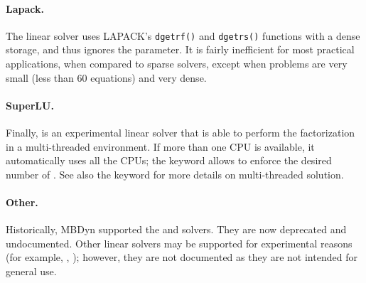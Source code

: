 \paragraph{Lapack.}
The  linear solver uses LAPACK's \texttt{dgetrf()}
and \texttt{dgetrs()} functions with a dense storage,
and thus ignores the  parameter.
It is fairly inefficient for most practical applications,
when compared to sparse solvers, except when problems are very small
(less than 60 equations) and very dense.

\paragraph{SuperLU.}
Finally,  is an experimental linear solver that is able to perform
the factorization in a multi-threaded environment.
If more than one CPU is available, it automatically uses all the CPUs;
the keyword  allows to enforce the desired number of .
See also the  keyword for more details on multi-threaded
solution.

\begin{comment}
Another linear solver, that is available mostly for historical reasons, 
is \kw{harwell}, with a \nt{workspace\_size}
of $ \nt{numdofs}\times\nt{numdofs} $, but in certain cases the user
might prefer a smaller workspace, since the matrix is handled as sparse,
while sometimes a larger space is required, since when the matrix is
full, a little more space is required, due to extra storage needs when
the matrix fills up.
\end{comment}

\paragraph{Other.}
Historically, MBDyn supported the  and  solvers.
They are now deprecated and undocumented.
Other linear solvers may be supported for experimental reasons
(for example, , );
however, they are not documented as they are not intended for general use.

